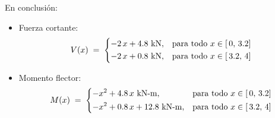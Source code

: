 \documentclass[ a4paper, twoside, 11pt]{article}
\begin{document}
\begin{problem}
En conclusi\'on: 
\begin{itemize}
\item Fuerza cortante: 
\[
V(x) \; = \;
\begin{dcases}
-2 \, x + 4.8 \text{ kN},
& \text{para todo } x \in [ \, 0, \, 3.2] \\
-2 \, x + 0.8 \text{ kN},
& \text{para todo } x \in [ \, 3.2, \, 4] \\
\end{dcases}
\]
\item Momento flector: 
\[
M(x) \; = \;
\begin{dcases}
- x^2 + 4.8 \, x \text{ kN-m},
& \text{para todo } x \in [ \, 0, \, 3.2] \\
- x^2 + 0.8 \, x + 12.8 \text{ kN-m} ,
& \text{para todo } x \in [ \, 3.2, \, 4] \\
\end{dcases}
\]
\end{itemize}

\end{problem}
\fullskip
\end{document}
